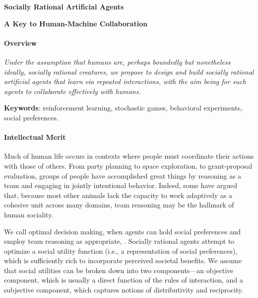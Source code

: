 
\centerline{\Large \bf Socially Rational Artificial Agents}

\vspace{\down}
\centerline{\large \bf A Key to Human-Machine Collaboration}

\vspace{\up}
\paragraph{Overview}

\emph{Under the assumption that humans are, perhaps boundedly
  but nonetheless ideally, socially rational creatures, we propose to
  design and build socially rational artificial agents that learn via
  repeated interactions, with the aim being for such agents to
  collaborate effectively with humans.}



{\bf Keywords}: reinforcement learning, stochastic games, behavioral experiments, social preferences.

\vspace{\up}
\paragraph{Intellectual Merit}

Much of human life occurs in contexts where people must coordinate
their actions with those of others.  From party planning to space
exploration, to grant-proposal evaluation, groups of people have
accomplished great things by reasoning as a team and engaging in
jointly intentional behavior.  Indeed, some have argued that, because
most other animals lack the capacity to work adaptively as a cohesive
unit across many domains, team reasoning may be the hallmark of human
sociality.

We call optimal decision making, when agents can hold social
preferences and employ team reasoning as appropriate, .  Socially rational agents attempt to optimize a
social utility function (i.e., a representation of social
preferences), which is sufficiently rich to incorporate perceived
societal benefits.  We assume that social utilities can be broken down
into two components---an objective component, which is usually a
direct function of the rules of interaction, and a subjective
component, which captures notions of distributivity and reciprocity.

